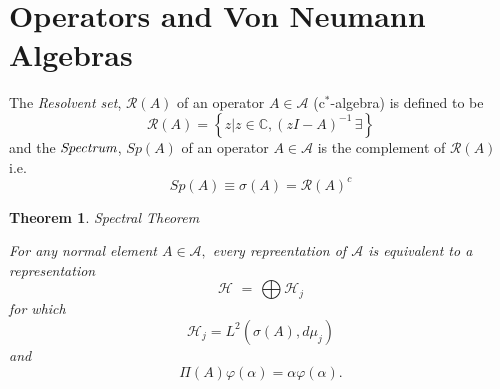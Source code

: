 \documentclass[aps,preprint]{revtex4}%
\newtheorem{theorem}{Theorem}
\begin{document}
\section{Operators and Von Neumann Algebras}

The \emph{Resolvent set}, $\mathcal{R}\left(  A\right)  $\emph{ }of an
operator $A\in\mathcal{A}$ (c$^{\ast}$-algebra) is defined to be
\begin{equation}
\mathcal{R}\left(  A\right)  =\left\{  \left.  z\right\vert z\in
\mathbb{C},\left(  zI-A\right)  ^{-1}\,\exists\right\}
\end{equation}
and the $\emph{Spectrum}$, $Sp\left(  A\right)  $ of an operator
$A\in\mathcal{A}$ is the complement of $\mathcal{R}\left(  A\right)  $ i.e.
\begin{equation}
Sp\left(  A\right)  \equiv\sigma\left(  A\right)  =\mathcal{R}\left(
A\right)  ^{c}%
\end{equation}


\begin{theorem}
Spectral Theorem

For any normal element $A\in\mathcal{A},$ every repreentation of $\mathcal{A}$
is equivalent to a representation
\begin{equation}
\mathcal{H\,\,}=\mathcal{\,}\bigoplus\mathcal{H}_{j}%
\end{equation}
for which
\begin{equation}
\mathcal{H}_{j}=L^{2}\left(  \sigma\left(  A\right)  ,d\mu_{j}\right)
\end{equation}
and
\begin{equation}
\Pi\left(  A\right)  \varphi\left(  \alpha\right)  =\alpha\varphi\left(
\alpha\right)  .
\end{equation}

\end{theorem}
\end{document}
